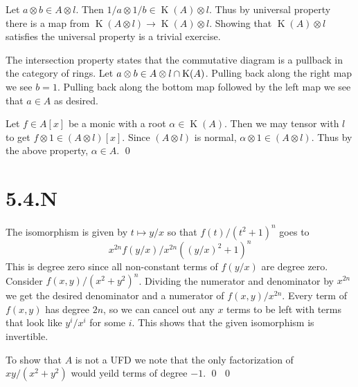 \documentclass{article}
\begin{document}
Let $a \otimes b \in A \otimes l$. Then $1/a \otimes 1/b \in \operatorname{K}(A) \otimes l$. Thus by universal property there is a map from $\operatorname{K}(A \otimes l) \to \operatorname{K}(A) \otimes l$. Showing that $\operatorname{K}(A) \otimes l$ satisfies the universal property is a trivial exercise.

The intersection property states that the commutative diagram is a pullback in the category of rings. Let $a \otimes b \in A \otimes l \cap \operatorname{K}(A)$. Pulling back along the right map we see $b=1$. Pulling back along the bottom map followed by the left map we see that $a \in A$ as desired.

Let $f \in A[x]$ be a monic with a root $\alpha \in \operatorname{K}(A)$. Then we may tensor with $l$ to get $f \otimes 1 \in (A \otimes l)[x]$. Since $(A \otimes l)$ is normal, $\alpha \otimes 1 \in (A \otimes l)$. Thus by the above property, $\alpha \in A$. \qed

\section{5.4.N}
The isomorphism is given by $t \mapsto y/x$ so that $f(t)/(t^2+1)^n$ goes to
\[x^{2n}f(y/x)/x^{2n}((y/x)^2+1)^n\]
This is degree zero since all non-constant terms of $f(y/x)$ are degree zero. Consider $f(x,y)/(x^2+y^2)^n$. Dividing the numerator and denominator by $x^{2n}$ we get the desired denominator and a numerator of $f(x, y)/x^{2n}$. Every term of $f(x,y)$ has degree $2n$, so we can cancel out any $x$ terms to be left with terms that look like $y^i/x^i$ for some $i$. This shows that the given isomorphism is invertible.

To show that $A$ is not a UFD we note that the only factorization of $xy/(x^2+y^2)$ would yeild terms of degree $-1$. \qed
\qed
\end{document}
